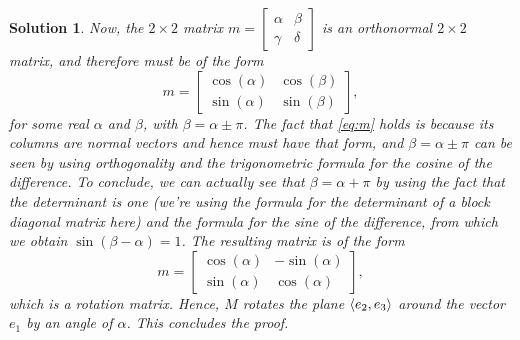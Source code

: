 \documentclass{article}
\theoremstyle{nonumberplain}
\newtheorem{sol}{Solution}
\DeclarePairedDelimiter{\braket}{\langle}{\rangle}
\begin{document}
\begin{sol}
Now, the $2 \times 2$ matrix $m = \left[\begin{smallmatrix} \alpha & \beta \\ \gamma & \delta \end{smallmatrix}\right]$ is an orthonormal $2 \times 2$ matrix, and therefore must be of the form
\begin{equation}\label{eq:m}
m = 
\begin{bmatrix}
\cos(\alpha) & \cos(\beta) \\
\sin(\alpha) & \sin(\beta)
\end{bmatrix},
\end{equation}
for some real $\alpha$ and $\beta$, with $\beta = \alpha \pm \pi$. The fact that \eqref{eq:m} holds is because its columns are normal vectors and hence must have that form, and $\beta = \alpha \pm \pi$ can be seen by using orthogonality and the trigonometric formula for the cosine of the difference. To conclude, we can actually see that $\beta = \alpha + \pi$ by using the fact that the determinant is one (we're using the formula for the determinant of a block diagonal matrix here) and the formula for the sine of the difference, from which we obtain $\sin(\beta - \alpha) = 1$. The resulting matrix is of the form
\begin{equation}
m = 
\begin{bmatrix}
\cos(\alpha) & -\sin(\alpha) \\
\sin(\alpha) & \cos(\alpha)
\end{bmatrix},
\end{equation}
which is a rotation matrix. Hence, $M$ rotates the plane $\braket{e_2, e_3}$ around the vector $e_1$ by an angle of $\alpha$. This concludes the proof.
\end{sol}
\end{document}

